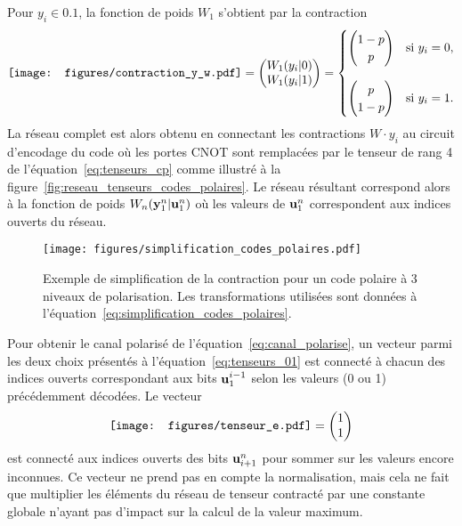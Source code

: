 Pour $y_i \in \qty{0, 1}$,
la fonction de poids $W_1$ s'obtient par la contraction
\begin{equation}
  \vcenter{\hbox{\texttt{[image: figures/contraction\_y\_w.pdf]}}}
  =
  \begin{pmatrix}
    W_1(y_i | 0) \\
    W_1(y_i | 1)
  \end{pmatrix}
  =
  \begin{cases}
    \begin{pmatrix}1 - p\\p\end{pmatrix} & \text{si } y_i = 0, \\[0.7cm]
    \begin{pmatrix}p\\1-p\end{pmatrix} & \text{si } y_i = 1.
  \end{cases}
\end{equation}
La réseau complet est alors obtenu en connectant les contractions $W \cdot y_i$
au circuit d'encodage du code où les portes CNOT sont remplacées par le tenseur 
de rang 4 de l'équation~\eqref{eq:tenseurs_cp} comme illustré à la 
figure~\ref{fig:reseau_tenseurs_codes_polaires}.
Le réseau résultant correspond alors à la fonction de poids $W_n(\vb y_1^n | \vb u_1^n)$
où les valeurs de $\vb u_1^n$ correspondent aux indices ouverts du réseau.

\begin{figure}
  \begin{center}
    \texttt{[image: figures/simplification\_codes\_polaires.pdf]}
  \end{center}
  \caption[Exemple de simplification de la contraction d'un code polaire]{
    Exemple de simplification de la contraction pour un code polaire à 3 niveaux de polarisation.
    Les transformations utilisées sont données à l'équation~\eqref{eq:simplification_codes_polaires}.
  }
  \label{fig:simplification_codes_polaires}
\end{figure}

Pour obtenir le canal polarisé de l'équation~\ref{eq:canal_polarise},
un vecteur parmi les deux choix présentés à l'équation~\ref{eq:tenseurs_01}
est connecté à chacun des indices ouverts correspondant aux bits $\vb u_1^{i-1}$
selon les valeurs (0 ou 1) précédemment décodées.
Le vecteur 
\begin{equation}
  \vcenter{\hbox{\texttt{[image: figures/tenseur\_e.pdf]}}}
  =\begin{pmatrix}1\\1\end{pmatrix}
\end{equation}
est connecté aux indices ouverts des bits $\vb u_{i+1}^{n}$ pour sommer
sur les valeurs encore inconnues.
Ce vecteur ne prend pas en compte la normalisation,
mais cela ne fait que multiplier les éléments du réseau de tenseur
contracté par une constante globale n'ayant pas d'impact sur la calcul de
la valeur maximum.

